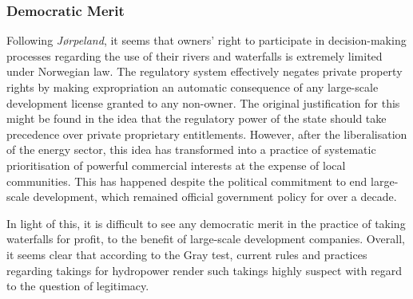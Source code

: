 \subsubsection{Democratic Merit}\label{sec:5:7:9}

Following \emph{Jørpeland}, it seems that owners' right to participate in decision-making processes regarding the use of their rivers and waterfalls is extremely limited under Norwegian law. The regulatory system effectively negates private property rights by making expropriation an automatic consequence of any large-scale development license granted to any non-owner. The original justification for this might be found in the idea that the regulatory power of the state should take precedence over private proprietary entitlements. However, after the liberalisation of the energy sector, this idea has transformed into a practice of systematic prioritisation of powerful commercial interests at the expense of local communities. This has happened despite the political commitment to end large-scale development, which remained official government policy for over a decade.

In light of this, it is difficult to see any democratic merit in the practice of taking waterfalls for profit, to the benefit of large-scale development companies. Overall, it seems clear that according to the Gray test, current rules and practices regarding takings for hydropower render such takings highly suspect with regard to the question of legitimacy.

